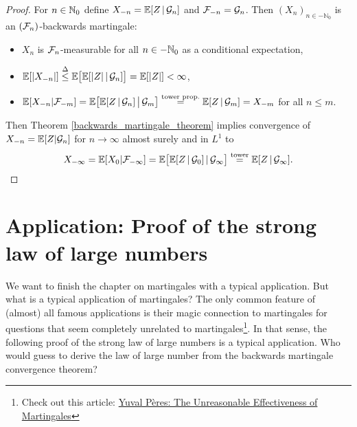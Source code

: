 \begin{proof}[Proof]
For $n\in\mathbb{N}_0$ define $X_{-n}= \mathbb{E}[Z\,|\,\mathcal{G}_n]$ and $\mathcal{F}_{-n} = \mathcal{G}_n$. Then $(X_{n})_{n\in-\mathbb{N}_0}$ is an $(\mathcal{F}_n)$-backwards martingale:
	\begin{itemize}
		\item
			$X_{n}$ is $\mathcal{F}_{n}$-measurable for all $n\in-\mathbb{N}_0$ as a conditional expectation,
		\item
			$\mathbb{E}[\lvert X_{-n}\rvert ] \overset{\Delta}{\leq} \mathbb{E} \big[ \mathbb{E} [ \lvert Z \rvert \,|\,\mathcal{G}_n] \big] = \mathbb{E}[\lvert Z \rvert] < \infty$,
		\item		
				$\mathbb{E}[X_{-n}|\mathcal{F}_{-m}] = \mathbb{E} \big[ \mathbb{E}[ Z\,|\,\mathcal{G}_n ]\,\big|\,\mathcal{G}_m \big] \overset{\text{tower prop.}}{=} \mathbb{E} [ Z\,|\,\mathcal{G}_m] = X_{-m}$ for all $n\leq m$.
	\end{itemize}
	Then Theorem \ref{backwards_martingale_theorem} implies convergence of $X_{-n}=\mathbb{E}[Z|\mathcal G_n]$ for $n\to\infty$ almost surely and in $L^1$ to $$ X_{-\infty} = \mathbb{E}[X_0|\mathcal{F}_{-\infty}] = \mathbb{E} \big[ \mathbb{E}[Z\,|\,\mathcal{G}_0]\,|\,\mathcal{G}_{\infty}\big] \overset{\text{tower}}{=} \mathbb{E}[Z\,|\,\mathcal{G}_{\infty}].$$
\end{proof}



\section{Application: Proof of the strong law of large numbers}
We want to finish the chapter on martingales with a typical application. But what is a typical application of martingales? The only common feature of (almost) all famous applications is their magic connection to martingales for questions that seem completely unrelated to martingales\footnote{Check out this article: \href{https://citeseerx.ist.psu.edu/viewdoc/download?doi=10.1.1.215.2970&rep=rep1&type=pdf}{Yuval P\`eres: The Unreasonable Effectiveness of Martingales}}. In that sense, the following proof of the strong law of large numbers is a typical application. Who would guess to derive the law of large number from the backwards martingale convergence theorem?


